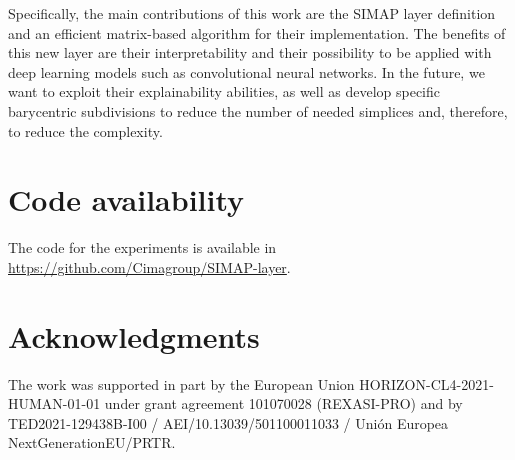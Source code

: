 Specifically, the main contributions of this work are the SIMAP layer definition and
an efficient matrix-based algorithm for their implementation. The benefits of this new layer are their interpretability
and their possibility to be applied with deep learning models such as convolutional neural networks. In the future, we want to exploit their explainability abilities, as well as develop specific barycentric subdivisions to reduce the number of needed simplices and, therefore, to reduce the complexity.



\section*{Code availability}

The code for the experiments is available in \url{https://github.com/Cimagroup/SIMAP-layer}.

\section*{Acknowledgments}

The work was supported in part by the European Union HORIZON-CL4-2021-HUMAN-01-01 under grant agreement 101070028 (REXASI-PRO) and by  
TED2021-129438B-I00 / AEI/10.13039/501100011033 / Unión Europea NextGenerationEU/PRTR.











 





\newpage

 







\vfill




